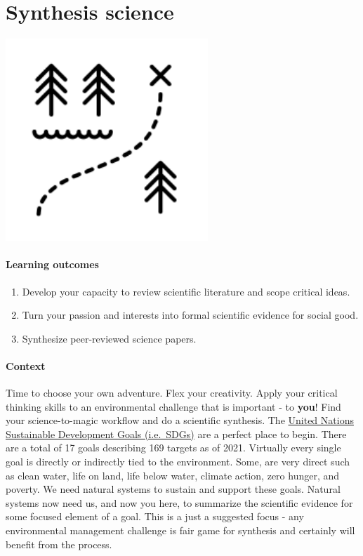 \documentclass[
]{book}
\providecommand{\tightlist}{%
  \setlength{\itemsep}{0pt}\setlength{\parskip}{0pt}}
\begin{document}
\hypertarget{synthesis}{%
\chapter{Synthesis science}\label{synthesis}}

\includegraphics[width=3in,height=\textheight]{./adventure.png}

\hypertarget{learning-outcomes-6}{%
\subsubsection*{Learning outcomes}\label{learning-outcomes-6}}

\begin{enumerate}
\def\labelenumi{\arabic{enumi}.}
\tightlist
\item
  Develop your capacity to review scientific literature and scope critical ideas.
\item
  Turn your passion and interests into formal scientific evidence for social good.\\
\item
  Synthesize peer-reviewed science papers.
\end{enumerate}

\hypertarget{context-5}{%
\subsubsection*{Context}\label{context-5}}

Time to choose your own adventure. Flex your creativity. Apply your critical thinking skills to an environmental challenge that is important - to \textbf{you}! Find your science-to-magic workflow and do a scientific synthesis. The \href{https://sdgs.un.org/goals}{United Nations Sustainable Development Goals (i.e.~SDGs)} are a perfect place to begin. There are a total of 17 goals describing 169 targets as of 2021. Virtually every single goal is directly or indirectly tied to the environment. Some, are very direct such as clean water, life on land, life below water, climate action, zero hunger, and poverty. We need natural systems to sustain and support these goals. Natural systems now need us, and now you here, to summarize the scientific evidence for some focused element of a goal. This is a just a suggested focus - any environmental management challenge is fair game for synthesis and certainly will benefit from the process.
\end{document}
